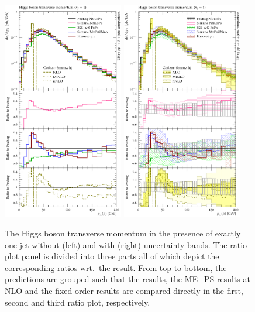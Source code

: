 \begin{figure}[t!]
  \centering
  \includegraphics[width=0.47\textwidth]{figures/hjetscomp_u_H_j_pT_excl.pdf}
  \hfill
  \includegraphics[width=0.47\textwidth]{figures/hjetscomp_H_j_pT_excl.pdf}
  \caption{\label{fig:hjetscomp:results:1obs:hpt_excl}%
    The Higgs boson transverse momentum in the presence of exactly one
    jet without (left) and with (right) uncertainty bands. The ratio
    plot panel is divided into three parts all of which depict the
    corresponding ratios wrt.~the \hjetscompPowheg \hjetscompNNLOPS result. From top to
    bottom, the predictions are grouped such that the \hjetscompNNLOPS results,
    the ME+PS results at NLO and the fixed-order results are compared
    directly in the first, second and third ratio plot, respectively.}
\end{figure}


